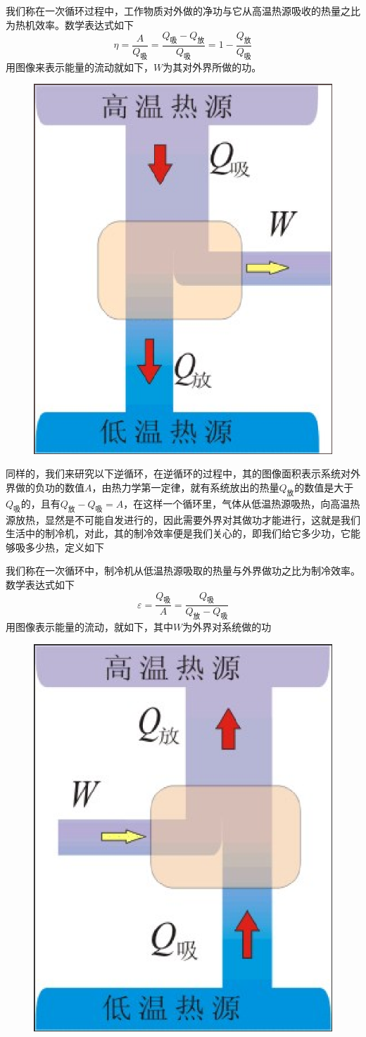 \documentclass[lang=cn,10pt]{elegantbook}
\begin{document}
	\begin{definition}[热机效率]
		我们称在一次循环过程中，工作物质对外做的净功与它从高温热源吸收的热量之比为热机效率。数学表达式如下
		\begin{equation*}
			\eta=\frac{A}{Q_{\text{吸}}}=\frac{Q_{\text{吸}}-Q_{\text{放}}}{Q_{\text{吸}}}=1-\frac{Q_{\text{放}}}{Q_{\text{吸}}}
		\end{equation*}
		用图像来表示能量的流动就如下，$W$为其对外界所做的功。
	\end{definition}
		\begin{figure}[h]
		\centering
		\includegraphics[width=0.2\linewidth]{screenshot006}
		\caption{}
		\label{fig:screenshot006}
	\end{figure}
	同样的，我们来研究以下逆循环，在逆循环的过程中，其的图像面积表示系统对外界做的负功的数值$A$，由热力学第一定律，就有系统放出的热量$Q_{\text{放}}$的数值是大于$Q_{\text{吸}}$的，且有$Q_{\text{放}}-Q_{\text{吸}} =A$，在这样一个循环里，气体从低温热源吸热，向高温热源放热，显然是不可能自发进行的，因此需要外界对其做功才能进行，这就是我们生活中的制冷机，对此，其的制冷效率便是我们关心的，即我们给它多少功，它能够吸多少热，定义如下
	\begin{definition}[制冷效率]
		我们称在一次循环中，制冷机从低温热源吸取的热量与外界做功之比为制冷效率。
		数学表达式如下
		\begin{equation*}
			\varepsilon =\frac{Q_{\text{吸}}}{A}=\frac{Q_{\text{吸}}}{Q_{\text{放}}-Q_{\text{吸}}}
		\end{equation*}
		用图像表示能量的流动，就如下，其中$W$为外界对系统做的功
	\end{definition}
	\begin{figure}[H]
		\centering
		\includegraphics[width=0.2\linewidth]{screenshot009}
		\caption{}
		\label{fig:screenshot009}
	\end{figure}
	
\end{document}
